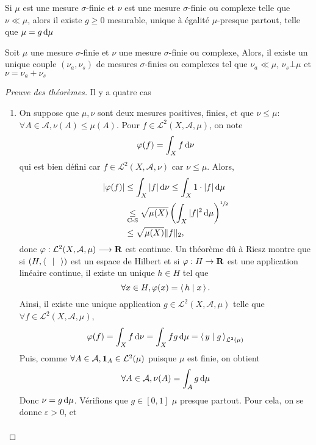 \begin{thm}
Si $\mu$ est une mesure  $\sigma$-finie et  $\nu$ est une mesure  $\sigma$-finie ou complexe telle que  $\nu\ll\mu$, alors il existe  $g\geq 0$ mesurable, unique à égalité $\mu$-presque partout, telle que  $\mu=g\mathop{}\!\mathrm d \mu$
\end{thm}

\begin{thm}
    Soit $\mu$ une mesure $\sigma$-finie et  $\nu$ une mesure  $\sigma$-finie ou complexe, Alors, il existe un unique couple  $(\nu_a, \nu_s)$ de mesures  $\sigma$-finies ou complexes tel que  $\nu_a \ll \mu$,  $\nu_s\bot \mu$ et  $\nu=\nu_a+\nu_s$
\end{thm}

\begin{proof}[Preuve des théorèmes]
    Il y a quatre cas \begin{enumerate}
        \item 
            On suppose que $\mu,\nu$ sont deux mesures positives, finies, et que $\nu\leq \mu$:  $\forall A\in \mathcal{A},\nu(A)\leq \mu(A)$.
Pour $f\in \mathcal{L}^2(X,\mathcal{A},\mu)$, on note \[\varphi(f)= \int_Xf\mathop{}\!\mathrm d\nu\] qui est bien défini car $f\in \mathcal{L}^2(X,\mathcal{A},\nu)$ car $\nu\leq \mu$.
Alors,
\begin{align*}
|\varphi(f)|&\leq \int_X |f|\mathop{}\!\mathrm d\nu \leq \int_X 1\cdot |f|\mathop{}\!\mathrm d\mu\\
&\underset{\text{C-S}}{\leq} \sqrt{\mu(X)} \left( \int_X |f|^2 \mathop{}\!\mathrm d\mu\right)^{\sfrac12}\\
&\leq \sqrt{\mu(X)}\|f\|_2,
\end{align*}
donc $\varphi: \mathcal  L^2(X, \mathcal A, \mu)\longrightarrow \mathbf R$ est continue.
    Un théorème dû à Riesz montre que si $(H,\scalar{\;}{\;} )$ est un espace de Hilbert et si $\varphi:H\to \mathbf R$ est une application linéaire continue, il existe un unique $h\in H$
    tel que \[\forall x\in H ,\varphi(x)=\scalar{h}{x} .\]
Ainsi, il existe une unique application $g\in \mathcal{L}^2 (X,\mathcal{A},\mu)$ telle que $\forall f\in \mathcal{L}^2(X,\mathcal{A},\mu)$, \[\varphi(f)=\int_Xf\diff\nu=\int_Xfg\diff\mu = \scalar{y}{g}  _{\mathcal{L}^2(\mu)}\]
Puis, comme $\forall A\in \mathcal{A},\bm{1}_A\in \mathcal{L}^2(\mu)$ puisque $\mu$ est finie, on obtient
\[\forall A\in \mathcal A , \nu(A)=\int_Ag\mathop{}\!\mathrm d\mu\]
Donc $\nu=g\mathop{}\!\mathrm d\mu$.
Vérifions que $g\in [0,1]$ $\mu$ presque partout.
Pour cela, on se donne $\varepsilon >0$, et
\begin{align*}

\end{align*}
\end{enumerate}
\end{proof}
